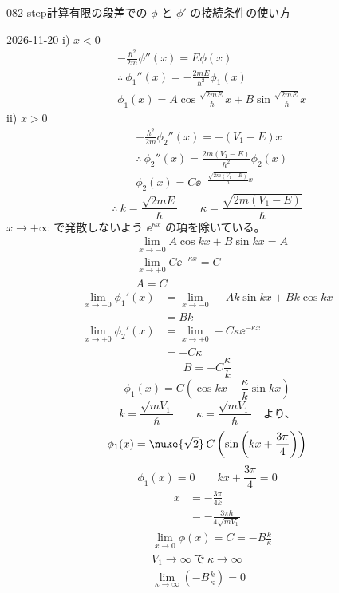 \documentclass[uplatex,dvipdfmx,a4paper,11pt]{jsarticle}
\begin{document}
\begin{mondai}{082-step}{計算}{有限の段差での $\phi$ と $\phi'$ の接続条件の使い方}
\begin{kotaeutsushi}{2026-11-20}
i) $x<0$
\begin{align*}
&-\frac{\hbar^{2}}{2m}\phi''(x)=E\phi(x)\\
&\therefore\ \phi_{1}''(x)=-\frac{2mE}{\hbar^{2}}\phi_{1}(x)\\
&\phi_{1}(x)=A\cos\frac{\sqrt{2mE}}{\hbar}x+B\sin\frac{\sqrt{2mE}}{\hbar}x
\end{align*}
ii) $x>0$
\begin{align*}
&-\frac{\hbar^{2}}{2m}\phi_{2}''(x)=-(V_{1}-E)x\\
&\therefore\ \phi_{2}''(x)=\frac{2m(V_{1}-E)}{\hbar^{2}}\phi_{2}(x)\\
&\phi_{2}(x)=C\ee^{-\frac{\sqrt{2m(V_{1}-E)}}{\hbar}x}
\end{align*}
\[ \therefore\ k=\frac{\sqrt{2mE}}{\hbar}\qquad\kappa=\frac{\sqrt{2m(V_{1}-E)}}{\hbar} \]
$x\to+\infty$ で発散しないよう $\ee^{\kappa x}$ の項を除いている。
\begin{align*}
&\lim_{x\to-0}A\cos kx+B\sin kx=A\\
&\lim_{x\to+0}C\ee^{-\kappa x}=C\\
&A=C
\end{align*}
\begin{align*}
\lim_{x\to-0}\phi_{1}'(x)&=\lim_{x\to-0}-Ak\sin kx+Bk\cos kx\\
&=Bk\\
\lim_{x\to+0}\phi_{2}'(x)&=\lim_{x\to+0}-C\kappa\ee^{-\kappa x}\\
&=-C\kappa
\end{align*}
\[ B=-C\frac{\kappa}{k} \]
\[ \phi_{1}(x)=C\left(\cos kx-\frac{\kappa}{k}\sin kx\right) \]
\[ k=\frac{\sqrt{mV_{1}}}{\hbar}\qquad\kappa=\frac{\sqrt{mV_{1}}}{\hbar}\quad\text{より、} \]
\[ \phi_{1}(x)=\nuke{\sqrt{2}}\,C\left(\sin\left(kx+\frac{3\pi}{4}\right)\right) \]
\[ \phi_{1}(x)=0\qquad kx+\frac{3\pi}{4}=0 \]
\begin{align*}
x&=-\frac{3\pi}{4k}\\
&=-\frac{3\pi\hbar}{4\sqrt{mV_{1}}}
\end{align*}
\begin{align*}
&\lim_{x\to0}\phi(x)=C=-B\frac{k}{\kappa}\\
&V_{1}\to\infty\ \text{で}\ \kappa\to\infty\\
&\lim_{\kappa\to\infty}\left(-B\frac{k}{\kappa}\right)=0

\end{align*}
\end{kotaeutsushi}
\end{mondai}
\end{document}
